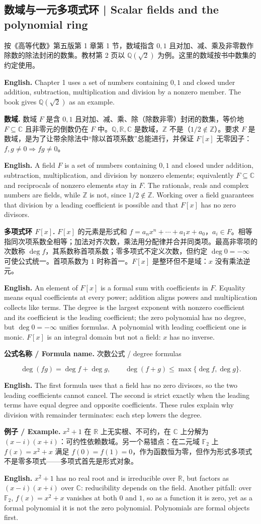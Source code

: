 \documentclass[UTF8,11pt,a4paper]{ctexart}
\newcommand{\EN}[1]{\par\noindent\textbf{English.} #1\par}
\newcommand{\FORMULA}[2]{\par\noindent\textbf{公式名称 / Formula name.} #1 / #2\par}
\newcommand{\EX}[2]{\par\noindent\textbf{例子 / Example.} #1\par\EN{#2}}
\begin{document}
\subsection{数域与一元多项式环 | Scalar fields and the polynomial ring}
\noindent 按《高等代数》第五版第 1 章第 1 节，数域指含 $0,1$ 且对加、减、乘及非零数作除数的除法封闭的数集。教材第 2 页以 $\mathbb Q(\sqrt2)$ 为例。这里的数域按书中数集的约定使用。
\EN{Chapter 1 uses a set of numbers containing $0,1$ and closed under addition, subtraction, multiplication and division by a nonzero member. The book gives $\mathbb Q(\sqrt2)$ as an example.}
\noindent\textbf{数域.} 数域 $F$ 是含 $0,1$ 且对加、减、乘、除（除数非零）封闭的数集，等价地 $F\subseteq\mathbb C$ 且非零元的倒数仍在 $F$ 中。$\mathbb Q,\mathbb R,\mathbb C$ 是数域，$\mathbb Z$ 不是（$1/2\notin\mathbb Z$）。要求 $F$ 是数域，是为了让带余除法中“除以首项系数”总能进行，并保证 $F[x]$ 无零因子：$f,g\ne0\Rightarrow fg\ne0$。
\EN{A field $F$ is a set of numbers containing $0,1$ and closed under addition, subtraction, multiplication, and division by nonzero elements; equivalently $F\subseteq\mathbb C$ and reciprocals of nonzero elements stay in $F$. The rationals, reals and complex numbers are fields, while $\mathbb Z$ is not, since $1/2\notin\mathbb Z$. Working over a field guarantees that division by a leading coefficient is possible and that $F[x]$ has no zero divisors.}
\noindent\textbf{多项式环 $F[x]$.} $F[x]$ 的元素是形式和 $f=a_nx^n+\cdots+a_1x+a_0$，$a_i\in F$。相等指同次项系数全相等；加法对齐次数，乘法用分配律并合并同类项。最高非零项的次数称 $\deg f$，其系数称首项系数；零多项式不定义次数，但约定 $\deg0=-\infty$ 可使公式统一。首项系数为 $1$ 时称首一。$F[x]$ 是整环但不是域：$x$ 没有乘法逆元。
\EN{An element of $F[x]$ is a formal sum with coefficients in $F$. Equality means equal coefficients at every power; addition aligns powers and multiplication collects like terms. The degree is the largest exponent with nonzero coefficient and its coefficient is the leading coefficient; the zero polynomial has no degree, but $\deg0=-\infty$ unifies formulas. A polynomial with leading coefficient one is monic. $F[x]$ is an integral domain but not a field: $x$ has no inverse.}
\FORMULA{次数公式}{degree formulas}
\[
\deg(fg)=\deg f+\deg g,\qquad \deg(f+g)\le\max\{\deg f,\deg g\}.
\]
\EN{The first formula uses that a field has no zero divisors, so the two leading coefficients cannot cancel. The second is strict exactly when the leading terms have equal degree and opposite coefficients. These rules explain why division with remainder terminates: each step lowers the degree.}
\EX{$x^2+1$ 在 $\mathbb R$ 上无实根、不可约，在 $\mathbb C$ 上分解为 $(x-i)(x+i)$：可约性依赖数域。另一个易错点：在二元域 $\mathbb F_2$ 上 $f(x)=x^2+x$ 满足 $f(0)=f(1)=0$，作为函数恒为零，但作为形式多项式不是零多项式——多项式首先是形式对象。}{$x^2+1$ has no real root and is irreducible over $\mathbb R$, but factors as $(x-i)(x+i)$ over $\mathbb C$: reducibility depends on the field. Another pitfall: over $\mathbb F_2$, $f(x)=x^2+x$ vanishes at both $0$ and $1$, so as a function it is zero, yet as a formal polynomial it is not the zero polynomial. Polynomials are formal objects first.}
\end{document}

